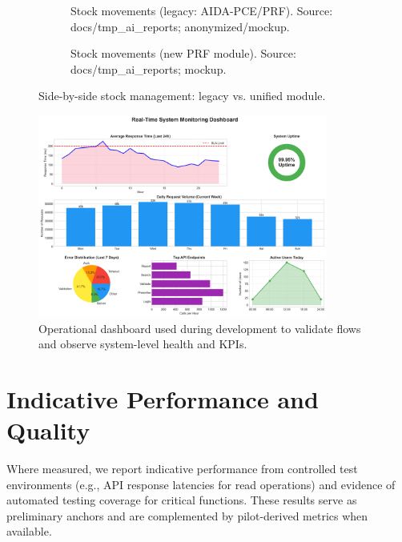 \begin{figure}[htbp]
    \centering
    \begin{subfigure}[t]{0.40\textwidth}
        \centering
        \caption{Stock movements (legacy: AIDA-PCE/PRF). Source: docs/tmp\_ai\_reports; anonymized/mockup.}
        \label{fig:stock_legacy}
    \end{subfigure}
    \begin{subfigure}[t]{0.40\textwidth}
        \centering
        \caption{Stock movements (new PRF module). Source: docs/tmp\_ai\_reports; mockup.}
        \label{fig:stock_new}
    \end{subfigure}
    \caption{Side-by-side stock management: legacy vs. unified module.}
\end{figure}

\begin{figure}[htbp]
    \centering
    \includegraphics[width=0.85\textwidth]{images/generated/monitoring_dashboard.png}
    \caption{Operational dashboard used during development to validate flows and observe system-level health and KPIs.}
    \label{fig:monitoring_dashboard}
\end{figure}

\section{Indicative Performance and Quality}
Where measured, we report indicative performance from controlled test environments (e.g., API response latencies for read operations) and evidence of automated testing coverage for critical functions. These results serve as preliminary anchors and are complemented by pilot-derived metrics when available.


